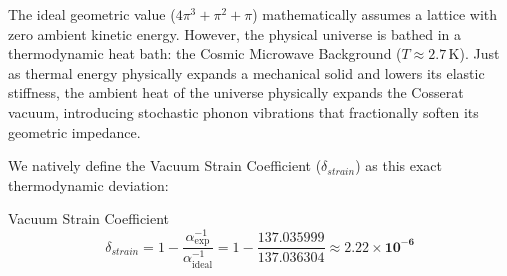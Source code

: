 The ideal geometric value ($4\pi^3 + \pi^2 + \pi$) mathematically assumes a lattice with zero ambient kinetic energy. However, the physical universe is bathed in a thermodynamic heat bath: the Cosmic Microwave Background ($T \approx 2.7\,$K). Just as thermal energy physically expands a mechanical solid and lowers its elastic stiffness, the ambient heat of the universe physically expands the Cosserat vacuum, introducing stochastic phonon vibrations that fractionally soften its geometric impedance.

We natively define the Vacuum Strain Coefficient ($\delta_{strain}$) as this exact thermodynamic deviation:

\begin{resultbox}{Vacuum Strain Coefficient}
\begin{equation}
    \delta_{strain} = 1 - \frac{\alpha^{-1}_{\text{exp}}}{\alpha^{-1}_{\text{ideal}}} = 1 - \frac{137.035999}{137.036304} \approx \mathbf{2.22 \times 10^{-6}}
    \label{eq:delta_strain}
\end{equation}
\end{resultbox}

